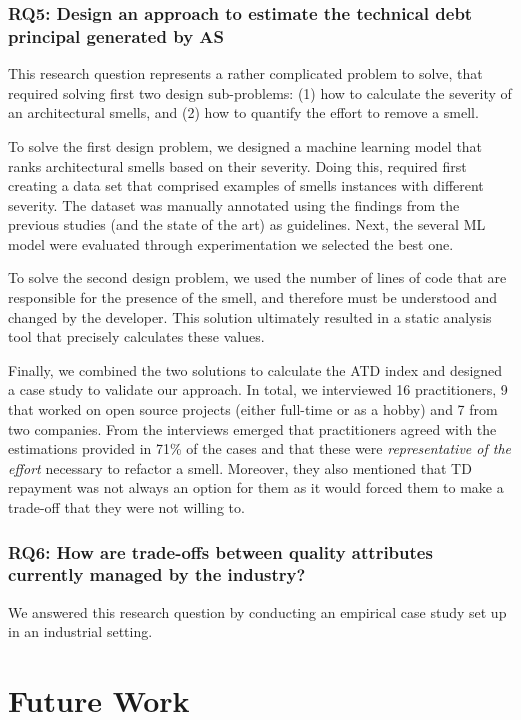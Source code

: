 \subsubsection*{RQ5: Design an approach to estimate the technical debt principal generated by AS}
This research question represents a rather complicated problem to solve, that required solving first two design sub-problems: (1) how to calculate the severity of an architectural smells, and (2) how to quantify the effort to remove a smell.

To solve the first design problem, we designed a machine learning model that ranks architectural smells based on their severity. 
Doing this, required first creating a data set that comprised examples of smells instances with different severity. The dataset was manually annotated using the findings from the previous studies (and the state of the art) as guidelines. 
Next, the several ML model were evaluated through experimentation we selected the best one.

To solve the second design problem, we used the number of lines of code that are responsible for the presence of the smell, and therefore must be understood and changed by the developer.
This solution ultimately resulted in a static analysis tool that precisely calculates these values.

Finally, we combined the two solutions to calculate the ATD index and designed a case study to validate our approach.
In total, we interviewed 16 practitioners, 9 that worked on open source projects (either full-time or as a hobby) and 7 from two companies.
From the interviews emerged that practitioners agreed with the estimations provided in 71\% of the cases and that these were \emph{representative of the effort} necessary to refactor a smell.
Moreover, they also mentioned that TD repayment was not always an option for them as it would forced them to make a trade-off that they were not willing to.


\subsubsection*{RQ6: How are trade-offs between quality attributes currently managed by the industry?}
We answered this research question by conducting an empirical case study set up in an industrial setting.




\section{Future Work}




